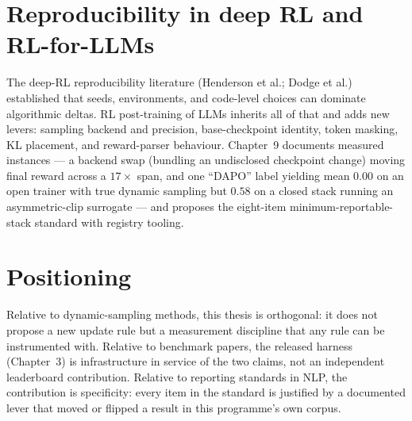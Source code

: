 \section{Reproducibility in deep RL and RL-for-LLMs}
The deep-RL reproducibility literature (Henderson et al.; Dodge et al.)
established that seeds, environments, and code-level choices can dominate
algorithmic deltas. RL post-training of LLMs inherits all of that and adds new
levers: sampling backend and precision, base-checkpoint identity, token
masking, KL placement, and reward-parser behaviour. Chapter~9 documents
measured instances --- a backend swap (bundling an undisclosed checkpoint
change) moving final reward across a $17\times$ span, and one ``DAPO'' label
yielding mean \ZVF{} $0.00$ on an open trainer with true dynamic sampling but
$0.58$ on a closed stack running an asymmetric-clip surrogate --- and proposes
the eight-item minimum-reportable-stack standard with registry tooling.

\section{Positioning}
Relative to dynamic-sampling methods, this thesis is orthogonal: it does not
propose a new update rule but a measurement discipline that any rule can be
instrumented with. Relative to benchmark papers, the released harness
(Chapter~3) is infrastructure in service of the two claims, not an
independent leaderboard contribution. Relative to reporting standards in NLP,
the contribution is specificity: every item in the standard is justified by a
documented lever that moved or flipped a result in this programme's own
corpus.
